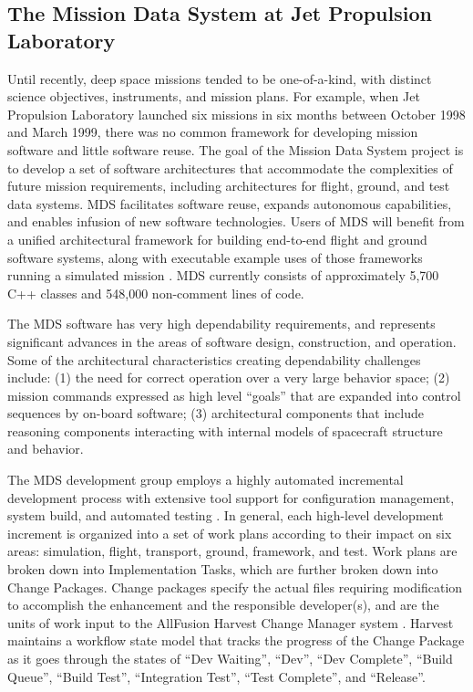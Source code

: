 \subsection{The Mission Data System at Jet Propulsion Laboratory}

Until recently, deep space missions tended to be one-of-a-kind, with
distinct science objectives, instruments, and mission plans. For example,
when Jet Propulsion Laboratory launched six missions in six months between
October 1998 and March 1999, there was no common framework for developing
mission software and little software reuse. The goal of the Mission Data
System project is to develop a set of software architectures that
accommodate the complexities of future mission requirements, including
architectures for flight, ground, and test data systems. MDS facilitates
software reuse, expands autonomous capabilities, and enables infusion of
new software technologies.  Users of MDS will benefit from a unified
architectural framework for building end-to-end flight and ground software
systems, along with executable example uses of those frameworks running a
simulated mission \cite{MDS:Advantage}.  MDS currently consists of
approximately 5,700 C++ classes and 548,000 non-comment lines of code. 

The MDS software has very high dependability requirements, and represents
significant advances in the areas of software design, construction, and
operation. Some of the architectural characteristics creating dependability
challenges include: (1) the need for correct operation over a very large
behavior space; (2) mission commands expressed as high level ``goals'' that
are expanded into control sequences by on-board software; (3) architectural
components that include reasoning components interacting with internal
models of spacecraft structure and behavior.

The MDS development group employs a highly automated incremental
development process with extensive tool support for configuration
management, system build, and automated testing \cite{Meyer01}.  In
general, each high-level development increment is organized into a set of
work plans according to their impact on six areas: simulation, flight,
transport, ground, framework, and test. Work plans are broken down into
Implementation Tasks, which are further broken down into Change Packages.
Change packages specify the actual files requiring modification to
accomplish the enhancement and the responsible developer(s), and are the
units of work input to the AllFusion Harvest Change Manager system
\cite{Harvest}. Harvest maintains a workflow state model that tracks the
progress of the Change Package as it goes through the states of ``Dev
Waiting'', ``Dev'', ``Dev Complete'', ``Build Queue'', ``Build Test'',
``Integration Test'', ``Test Complete'', and ``Release''.  

